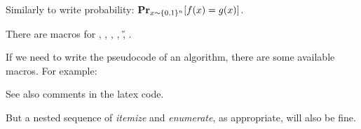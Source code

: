 \documentclass[11pt]{article}
\begin{document}
Similarly to write probability: $\mathop{\bf {Pr}}_{x\sim \{0,1\}^n} [ f(x) = g(x) ]$.

There are macros for \N, \Z, \R, \B, \H, \F.

If we  need to write the pseudocode of an algorithm, there are some available macros. For example:

\noindent{}


\bigskip

See also comments in the latex code.

But a nested sequence of {\em itemize} and {\em enumerate}, as appropriate, will also be fine.
\end{document}

